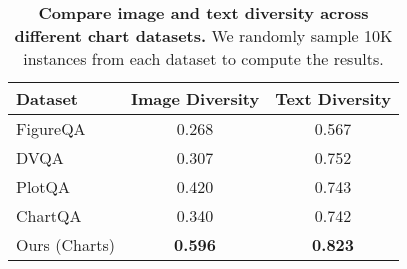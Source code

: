 
\begin{table}[H]
\centering
\small
\begin{tabular}{lcc}
\toprule
\textbf{Dataset} & \textbf{Image Diversity} & \textbf{Text Diversity} \\
\midrule
FigureQA & 0.268 & 0.567 \\
DVQA & 0.307 & 0.752 \\
PlotQA & 0.420 & 0.743 \\
ChartQA & 0.340 & 0.742 \\
\cellcolor[gray]{0.9}Ours (Charts) & \cellcolor[gray]{0.9}\textbf{0.596} & \cellcolor[gray]{0.9}\textbf{0.823} \\
\bottomrule
\end{tabular}
\vspace{-.1cm}
\caption{\textbf{Compare image and text diversity across different chart datasets.} We randomly sample 10K instances from each dataset to compute the results.}
\label{tab:diversity}
\vspace{-.1cm}
\end{table}
